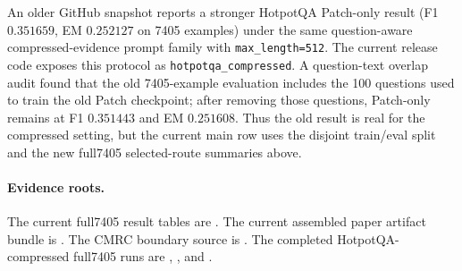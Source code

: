 \documentclass{article}
\theoremstyle{plain}
\theoremstyle{definition}
\theoremstyle{remark}
\begin{document}
\begin{table}[t]
  \centering
  \scriptsize
  \caption{\textbf{Current non-CMRC boundary checks.}
  HotpotQA-compressed reports the full7405 selected route. WikiText-2 reports
  teacher-forced language-modeling quality.}
  \label{tab:current_non_cmrc_diagnostics}
  \setlength{\tabcolsep}{2pt}
\end{table}

An older GitHub snapshot reports a stronger HotpotQA Patch-only result
(F1 $0.351659$, EM $0.252127$ on 7405 examples) under the same
question-aware compressed-evidence prompt family with \texttt{max\_length=512}.
The current release code exposes this protocol as
\texttt{hotpotqa\_compressed}.  A question-text overlap audit found that the
old 7405-example evaluation includes the 100 questions used to train the old
Patch checkpoint; after removing those questions, Patch-only remains at F1
$0.351443$ and EM $0.251608$.  Thus the old result is real for the compressed
setting, but the current main row uses the disjoint train/eval split and the
new full7405 selected-route summaries above.

\paragraph{Evidence roots.}
\begin{sloppypar}
The current full7405 result tables are
.
The current assembled paper artifact bundle is
.
The CMRC boundary source is
.
The completed HotpotQA-compressed full7405 runs are
,
,
and
.
\end{sloppypar}
\end{document}
